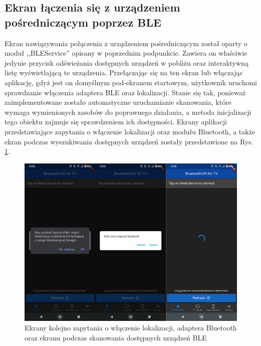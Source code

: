 \documentclass[12pt,twoside]{article}
\begin{document}
\subsection{Ekran łączenia się z urządzeniem pośredniczącym poprzez BLE}
Ekran nawiązywania połączenia z urządzeniem pośredniczącym został oparty o moduł ,,BLEService'' opisany w poprzednim podpunkcie. Zawiera on właściwie jedynie przycisk odświeżania dostępnych urządzeń w pobliżu oraz interaktywną listę wyświetlającą te urządzenia.
Przełączając się na ten ekran lub włączając aplikację, gdyż jest on domyślnym pod-ekranem startowym, użytkownik uruchomi sprawdzanie włączenia adaptera BLE oraz lokalizacji. Stanie się tak, ponieważ zaimplementowane zostało automatyczne uruchamianie skanowania, które wymaga wymienionych zasobów do poprawnego działania, a metoda inicjalizacji tego obiektu zajmuje się sprawdzeniem ich dostępności. Ekrany aplikacji przedstawiające zapytania o włączenie lokalizacji oraz modułu Bluetooth, a także ekran podczas wyszukiwania dostępnych urządzeń zostały przedstawione na Rys. \ref*{Fig:initBLE}.
\begin{figure}[ht]
   \centering
   \includegraphics[width=14cm]{images/initBLE.png}
   \caption{Ekrany kolejno zapytania o włączenie lokalizacji, adaptera Bluetooth oraz ekranu podczas skanowania dostępnych urządzeń BLE}
   \label{Fig:initBLE}
\end{figure}
\end{document}
